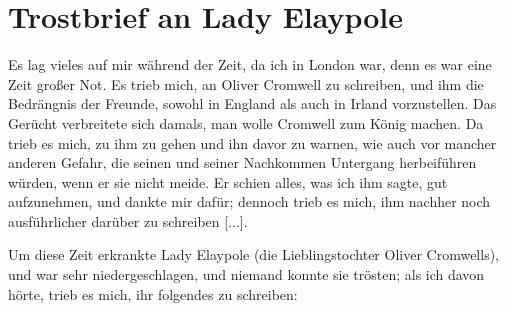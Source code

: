 \section{Trostbrief an Lady Elaypole}

Es lag vieles auf mir während der Zeit, da ich in London
war, denn es war eine Zeit großer Not. Es trieb mich, an
Oliver Cromwell zu schreiben, 
und ihm die Bedrängnis der Freunde, sowohl in England 
als auch in Irland vorzustellen.
Das Gerücht verbreitete sich damals, man wolle Cromwell zum
König machen. Da trieb es mich, zu ihm zu gehen und ihn davor 
zu warnen, wie auch vor mancher anderen Gefahr, die seinen
und seiner Nachkommen Untergang herbeiführen würden, wenn
er sie nicht meide. Er schien alles, was ich ihm sagte, gut 
aufzunehmen, und dankte mir dafür; dennoch trieb es mich, ihm 
nachher noch ausführlicher darüber zu schreiben [...].


Um diese Zeit erkrankte Lady Elaypole
 (die Lieblingstochter 
Oliver Cromwells), und 
war sehr niedergeschlagen, und niemand konnte sie trösten; als 
ich davon hörte, trieb es mich, ihr folgendes
zu schreiben:

